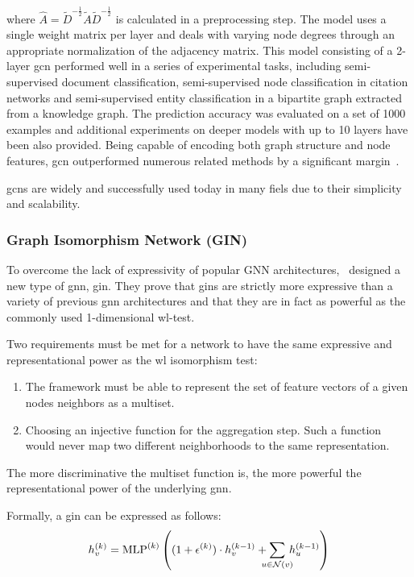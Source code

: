 where $\hat{A} = \tilde{D}^{-\frac{1}{2}}\tilde{A}\tilde{D}^{-\frac{1}{2}}$
is calculated in a preprocessing step. The model uses a single weight matrix per layer and
deals with varying node degrees through an appropriate normalization of the adjacency matrix.
This model consisting of a 2-layer \ac{gcn} performed well in a series of experimental tasks, including semi-supervised document classification, semi-supervised node classification in citation networks and semi-supervised entity classification in a bipartite graph extracted from a knowledge graph.
The prediction accuracy was evaluated on a set of 1000 examples and additional experiments on deeper models with up to 10 layers have been also provided. Being capable of encoding both graph structure and node features, \ac{gcn} outperformed numerous related methods by a significant margin~\cite{Kipf2017}.

\Acfp{gcn} are widely and successfully used today in many fiels due to their simplicity and scalability.

\subsubsection{Graph Isomorphism Network (GIN)}
\label{sec:related:architectures:gin}
To overcome the lack of expressivity of popular GNN architectures,~\citet{Xu2019} designed a new type of \ac{gnn}, \ac{gin}. They prove that \acp{gin} are strictly more expressive than a variety of previous \ac{gnn} architectures and that they are in fact as powerful as the commonly used 1-dimensional \acf{wl}-test.

Two requirements must be met for a network to have the same expressive and representational
power as the \ac{wl} isomorphism test:
\begin{enumerate}
    \item The framework must be able to represent the set of feature vectors of a given nodes
          neighbors as a multiset.
    \item Choosing an injective function for the aggregation step. Such a function would never
          map two different neighborhoods to the same representation.
\end{enumerate}
The more discriminative the multiset function is, the more powerful the representational power of the underlying \ac{gnn}.

Formally, a \acf{gin} can be expressed as follows:
\begin{align*}
    h^{(k)}_{v}  = \mathrm{MLP}^{(k)} \left((1 + \epsilon^{(k)}) \cdot h^{(k-1)}_{v} + \smashoperator{\sum_{{u} \in{\mathcal{N}(v)}}} \,h^{(k-1)}_{u}\right) \\
\end{align*}

